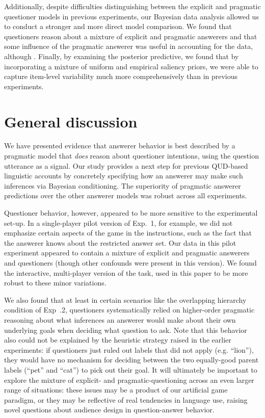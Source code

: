 \documentclass[12pt, floatsintext, jou]{apa6}
\begin{document}
Additionally, despite difficulties distinguishing between the explicit and pragmatic questioner models in previous experiments, our Bayesian data analysis allowed us to conduct a stronger and more direct model comparison. We found that questioners reason about a mixture of explicit and pragmatic answerers and that some influence of the pragmatic answerer was useful in accounting for the data, although . Finally, by examining the posterior predictive, we found that by incorporating a mixture of uniform and empirical saliency priors, we were able to capture item-level variability much more comprehensively than in previous experiments. 

\section{General discussion}
\label{sec:gd}

We have presented evidence that answerer behavior is best described by a pragmatic model that \emph{does} reason about questioner intentions, using the question utterance as a signal. Our study provides a next step for previous QUD-based linguistic accounts by concretely specifying how an answerer may make such inferences via Bayesian conditioning. The superiority of pragmatic answerer predictions over the other answerer models was robust across all experiments. 

Questioner behavior, however, appeared to be more sensitive to the experimental set-up. In a single-player pilot version of Exp.~1, for example, we did not emphasize certain aspects of the game in the instructions, such as the fact that the answerer knows about the restricted answer set. Our data in this pilot experiment appeared to contain a mixture of explicit and pragmatic answerers and questioners (though other confounds were present in this version). We found the interactive, multi-player version of the task, used in this paper to be more robust to these minor variations. 

We also found that at least in certain scenarios like the overlapping hierarchy condition of Exp~.2, questioners systematically relied on higher-order pragmatic reasoning about what inferences an answerer would make about their own underlying goals when deciding what question to ask. Note that this behavior also could not be explained by the heuristic strategy raised in the earlier experiments: if questioners just ruled out labels that did not apply (e.g. ``lion''), they would have no mechanism for deciding between the two equally-good parent labels (``pet'' and ``cat'') to pick out their goal. It will ultimately be important to explore the mixture of explicit- and pragmatic-questioning across an even larger range of situations: these issues may be a product of our artificial game paradigm, or they may be reflective of real tendencies in language use, raising novel questions about audience design in question-answer behavior.
\end{document}
